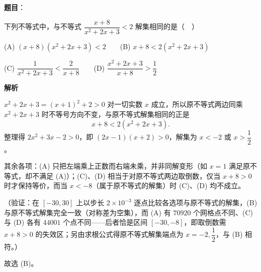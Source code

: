 \begin{answer}

\textbf{题目}：

下列不等式中，与不等式 \(\dfrac{x+8}{x^{2}+2x+3}<2\) 解集相同的是（　）

(A) \((x+8)(x^{2}+2x+3)<2\)　　(B) \(x+8<2(x^{2}+2x+3)\)

(C) \(\dfrac{1}{x^{2}+2x+3}<\dfrac{2}{x+8}\)　　(D) \(\dfrac{x^{2}+2x+3}{x+8}>\dfrac{1}{2}\)

\textbf{解析}

\(x^{2}+2x+3=(x+1)^{2}+2>0\) 对一切实数 \(x\) 成立，所以原不等式两边同乘 \(x^{2}+2x+3\) 时不等号方向不变，与原不等式解集相同的正是
\nopagebreak[4]
\[
x+8<2(x^{2}+2x+3).
\]
整理得 \(2x^{2}+3x-2>0\)，即 \((2x-1)(x+2)>0\)，解集为 \(x<-2\) 或 \(x>\dfrac{1}{2}\)。

其余各项：(A) 只把左端乘上正数而右端未乘，并非同解变形（如 \(x=1\) 满足原不等式，却不满足 (A)）；(C)、(D) 相当于对原不等式两边取倒数，仅当 \(x+8>0\) 时才保持等价，而当 \(x<-8\)（属于原不等式的解集）时 (C)、(D) 均不成立。

（验证：在 \([-30,30]\) 上以步长 \(2\times10^{-3}\) 逐点比较各选项与原不等式的解集，(B) 与原不等式解集完全一致（对称差为空集），而 (A) 有 \(70920\) 个网格点不同、(C) 与 (D) 各有 \(44001\) 个点不同——后者恰是区间 \([-30,-8]\)，即取倒数需 \(x+8>0\) 的失效区；另由求根公式得原不等式解集端点为 \(x=-2,\dfrac{1}{2}\)，与 (B) 相符。）

故选 (B)。


\end{answer}
